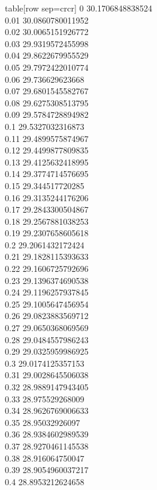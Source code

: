   table[row sep=crcr]{%
0	30.1706848838524\\
0.01	30.0860780011952\\
0.02	30.0065151926772\\
0.03	29.9319572455998\\
0.04	29.8622679955529\\
0.05	29.7972422010774\\
0.06	29.736629623668\\
0.07	29.6801545582767\\
0.08	29.6275308513795\\
0.09	29.5784728894982\\
0.1	29.5327032316873\\
0.11	29.4899575874967\\
0.12	29.4499877809835\\
0.13	29.4125632418995\\
0.14	29.3774714576695\\
0.15	29.344517720285\\
0.16	29.3135244176206\\
0.17	29.2843300504867\\
0.18	29.2567881038253\\
0.19	29.2307658605618\\
0.2	29.2061432172424\\
0.21	29.1828115393633\\
0.22	29.1606725792696\\
0.23	29.1396374690538\\
0.24	29.1196257937845\\
0.25	29.1005647456954\\
0.26	29.0823883569712\\
0.27	29.0650368069569\\
0.28	29.0484557986243\\
0.29	29.0325959986925\\
0.3	29.0174125357153\\
0.31	29.0028645506038\\
0.32	28.9889147943405\\
0.33	28.975529268009\\
0.34	28.9626769006633\\
0.35	28.95032926097\\
0.36	28.9384602989539\\
0.37	28.9270461145538\\
0.38	28.916064750047\\
0.39	28.9054960037217\\
0.4	28.8953212624658\\
}
